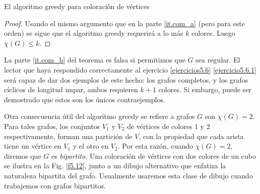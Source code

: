 \begin{section}{El algoritmo greedy para coloración de vértices}
\begin{proof}
Usando el mismo argumento que en la parte \ref{it.com_a} (pero para este orden) se sigue que el algoritmo greedy requerirá a lo más $k$ colores. Luego $\chi(G)\le k$. 
\end{proof}

La parte \ref{it.com_b} del teorema es falsa si permitimos que $G$ sea regular. El lector que haya respondido correctamente al ejercicio \ref{ejercicios5.6} \ref{ejercicio5.6.1} será capaz de dar dos ejemplos de este hecho: los grafos completos, y los grafos cíclicos de longitud impar, ambos requieren $k+1$ colores. Si
embargo, puede ser demostrado que estos son los únicos contraejemplos.

Otra consecuencia útil del algoritmo greedy se refiere a grafos $G$ son $\chi(G)=2$. Para tales grafos, los conjuntos $V_1$ y $V_2$ de vértices de colores $1$ y $2$ respectivamente, forman una partición de $V$, con la propiedad que cada arista tiene un vértice en $V_1$ y el otro en $V_2$. Por esta razón, cuando $\chi(G)=2$, diremos que $G$ es \textit{bipartito}.  Una coloración de vértices con dos colores de un cubo se ilustra en la Fig. \ref{f5.12}, junto a un dibujo alternativo que enfatiza la naturaleza bipartita del grafo. Usualmente usaremos esta clase de dibujo cuando trabajemos con grafos bipartitos.


\end{section}
